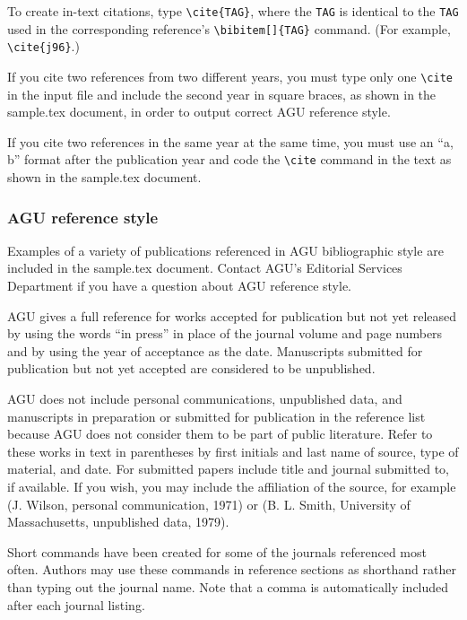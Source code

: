 \begin{article}
To create in-text citations, type \verb"\cite{TAG}", 
where the {\tt TAG} is identical to the {\tt TAG} 
used in the corresponding reference's 
\verb"\bibitem[]{TAG}" command.  (For example,
\verb"\cite{j96}".)

If you cite two references from two different years,
you must type only one \verb"\cite" in the input file 
and include the second year in square braces, as shown
in the sample.tex document, in order to output correct 
AGU reference style.

If you cite two references in the same year at
the same time, you must use an ``a, b'' format
after the publication year and code the 
\verb"\cite" command in the text as shown 
in the sample.tex document.


\subsubsection{AGU reference style}
Examples of a variety of publications referenced
in AGU bibliographic style are included in the
sample.tex document.  Contact AGU's Editorial
Services Department if you have a question about 
AGU reference style.


AGU gives a full reference for works accepted for 
publication but not yet released by using the words 
``in press'' in place of the journal volume and 
page numbers and by using the year of acceptance as 
the date.  Manuscripts submitted for publication 
but not yet accepted are considered to be unpublished.


AGU does not include personal communications, unpublished 
data, and manuscripts in preparation or submitted for 
publication in the reference list because AGU does not 
consider them to be part of public literature.  Refer to 
these works in text in parentheses by first initials and 
last name of source, type of material, and date.  For 
submitted papers include title and journal submitted to, 
if available.  If you wish, you may include the affiliation 
of the source, for example (J. Wilson, personal communication, 
1971) or (B. L. Smith, University of Massachusetts, unpublished 
data, 1979).


Short commands have been created for some of the 
journals referenced most often.  Authors may use 
these commands in reference sections as shorthand 
rather than typing out the journal name.  Note 
that a comma is automatically included after each 
journal listing.


\end{article}

